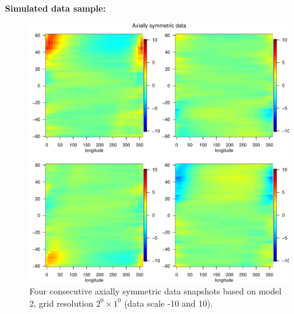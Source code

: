 
%
%



{\bf Simulated data sample:}

\begin{figure}[H]
\label{grid_plot_model2}
\begin{center}
\includegraphics [scale=1]{graphs/Data_sample_120_model2.pdf}
\caption{Four consecutive axially symmetric data snapshots based on model 2, grid resolution $2^0\times 1^0$ (data scale -10 and 10).}
\end{center}
\end{figure}

